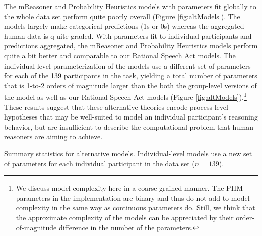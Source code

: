 \documentclass[floatsintext, doc]{apa6}
\begin{document}
The mReasoner and Probability Heuristics models with parameters fit globally to the whole data set perform quite poorly overall (Figure \ref{fig:altModels}). 
The models largely make categorical predictions (1s or 0s) whereas the aggregated human data is q	uite graded.
With parameters fit to individual participants and predictions aggregated, the mReasoner and Probability Heuristics models perform quite a bit better and comparable to our Rational Speech Act models.
The individual-level parameterization of the models use a different set of parameters for each of the 139 participants in the task, yielding a total number of parameters that is 1-to-2 orders of magnitude larger than the both the group-level versions of the model as well as our Rational Speech Act models (Figure \ref{fig:altModels}).\footnote{We discuss model complexity here in a coarse-grained manner. The PHM parameters in the  implementation are binary and thus do not add to model complexity in the same way as continuous parameters do. Still, we think that the approximate complexity of the models can be appreciated by their order-of-magnitude difference in the number of the parameters.}
These results suggest that these alternative theories encode process-level hypotheses that may be well-suited to model an individual participant's reasoning behavior, but are insufficient to describe the computational problem that human reasoners are aiming to achieve. 



\begin{center}
\begin{table}[h]
\centering
{}\caption{Summary statistics for alternative models. Individual-level models use a new set of parameters for each individual participant in the data set ($n=139$).}\label{tab:altStats}
\end{table}
\end{center}
\end{document}
